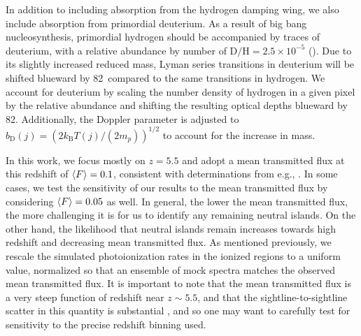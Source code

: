 In addition to including absorption from the hydrogen damping wing, we also include absorption from primordial deuterium. As a result of big bang nucleosynthesis, primordial hydrogen should be accompanied by traces of deuterium, with a relative abundance by number of $\text{D}/\text{H} = 2.5\times 10^{-5}$ (\citealt{Cooke:2013cba}). Due to its slightly increased reduced mass, Lyman series transitions in deuterium will be shifted blueward by 82\kms\ compared to the same transitions in hydrogen. We account for deuterium by scaling the number density of hydrogen in a given pixel by the relative abundance and shifting the resulting optical depths blueward by 82\kms. Additionally, the Doppler parameter is adjusted to $b_{\text{D}}(j) = \left( 2k_{\text{B}}T(j)/(2m_{p}) \right)^{1/2}$ to account for the increase in mass.

In this work, we focus mostly on $z=5.5$ and adopt a mean transmitted flux at this redshift of $\langle F \rangle=0.1$, consistent with determinations from e.g., \cite{Becker:2001ee}. In some cases, we test the
sensitivity of our results to the mean transmitted flux by considering $\langle F \rangle=0.05$ as well. In general, the lower the mean transmitted flux, the more challenging it is for us to identify any remaining
neutral islands. On the other hand, the likelihood that neutral islands remain increases towards high redshift and decreasing mean transmitted flux. As mentioned previously, we rescale the simulated photoionization rates in the ionized regions to a uniform value,
normalized so that an ensemble of mock spectra matches the observed mean transmitted flux. It is important to note that the mean transmitted flux is a very steep function of redshift near $z \sim 5.5$, and that the sightline-to-sightline scatter in this quantity is substantial \citep{Fan:2005es}, and so one may want to carefully test for sensitivity to the precise redshift binning used.


